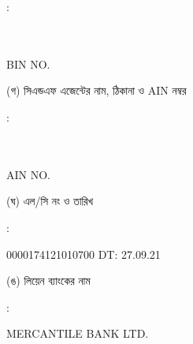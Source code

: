 \documentclass[12pt]{article}
\newcommand{\lcno}{0000174121010700}
\newcommand{\lcdt}{27.09.21}
\newcommand{\lienbank}{MERCANTILE BANK LTD.}
\newcommand{\impn}{\scml}
\newcommand{\impadd}{\scmla}
\newcommand{\impbin}{\scmlbin}
\begin{document}
\begin{minipage}[t]{0.02\linewidth}
:
\end{minipage}
\begin{minipage}[t]{0.53\linewidth}
\textbf{{\impn}}
\\
{\impadd}
\\
BIN NO. {\impbin}
\\
\end{minipage}
\begin{minipage}[t]{0.05\linewidth}
\hspace*{1em}
\end{minipage}
\begin{minipage}[t]{0.40\linewidth}
(গ) সিএন্ডএফ এজেন্টের নাম, ঠিকানা
ও AIN নম্বর
\end{minipage}
\begin{minipage}[t]{0.02\linewidth}
:
\end{minipage}
\begin{minipage}[t]{0.53\linewidth}
\textbf{{\cnfn}}
\\
{\cnfadd}
\\
AIN NO. {\cnfain}
\\
\end{minipage}
\begin{minipage}[t]{0.05\linewidth}
\hspace*{1em}
\end{minipage}
\begin{minipage}[t]{0.40\linewidth}
(ঘ) এল/সি নং ও তারিখ
\end{minipage}
\begin{minipage}[t]{0.02\linewidth}
:
\end{minipage}
\begin{minipage}[t]{0.53\linewidth}
{\lcno} \hspace{2em} DT: {\lcdt}
\\
\end{minipage}
\begin{minipage}[t]{0.05\linewidth}
\hspace*{1em}
\end{minipage}
\begin{minipage}[t]{0.40\linewidth}
(ঙ) লিয়েন ব্যাংকের নাম
\end{minipage}
\begin{minipage}[t]{0.02\linewidth}
:
\end{minipage}
\begin{minipage}[t]{0.53\linewidth}
{\lienbank}
\\
\end{minipage}
\end{document}
